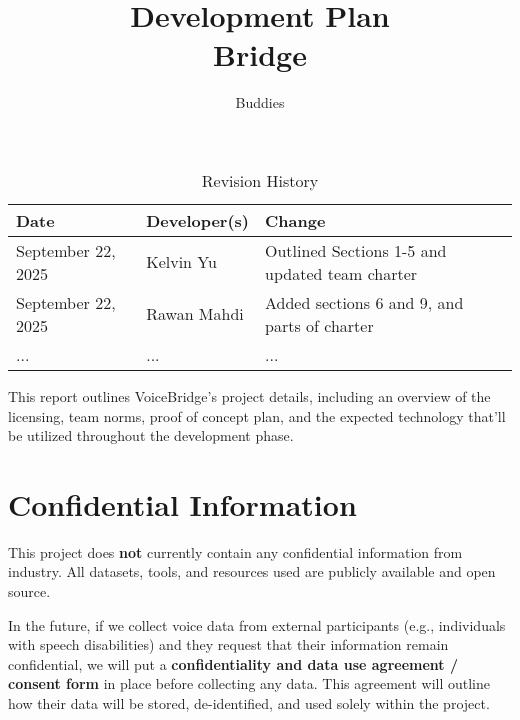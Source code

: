 \documentclass{article}
\title{Development Plan\\\Voice Bridge}
\author{\Speech Buddies}
\date{}
\begin{document}
\maketitle

\begin{table}[hp]
\caption{Revision History} \label{TblRevisionHistory}
\begin{tabularx}{\textwidth}{llX}
\toprule
\textbf{Date} & \textbf{Developer(s)} & \textbf{Change}\\
\midrule
September 22, 2025 & Kelvin Yu & Outlined Sections 1-5 and updated team charter\\
September 22, 2025 & Rawan Mahdi & Added sections 6 and 9, and parts of charter \\
... & ... & ...\\
\bottomrule
\end{tabularx}
\end{table}

\newpage{}

\begin{comment}\wss{Put your introductory blurb here.  Often the blurb is a brief roadmap of
what is contained in the report.}
\end{comment}

This report outlines VoiceBridge’s project details, including an overview of the licensing, team norms, proof of concept plan, and the expected technology that’ll be utilized throughout the development phase.

\begin{comment}\wss{Additional information on the development plan can be found in the
\href{https://gitlab.cas.mcmaster.ca/courses/capstone/-/blob/main/Lectures/L02b_POCAndDevPlan/POCAndDevPlan.pdf?ref_type=heads}
{lecture slides}.}
\end{comment}



\section{Confidential Information}

This project does \textbf{not} currently contain any confidential information from industry. All datasets, tools, and resources used are publicly available and open source.

In the future, if we collect voice data from external participants (e.g., individuals with speech disabilities) and they request that their information remain confidential, we will put a \textbf{confidentiality and data use agreement / consent form} in place before collecting any data. This agreement will outline how their data will be stored, de-identified, and used solely within the project.
\end{document}
